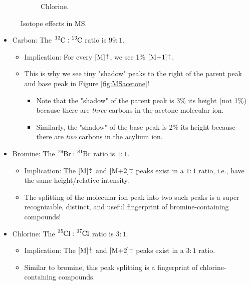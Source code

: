 \documentclass[../notes.tex]{subfiles}
\begin{document}
\begin{itemize}
\begin{figure}[H]
\begin{subfigure}[b]{0.17\linewidth}
            \caption{Chlorine.}
            \label{fig:isotopeEffectsMSc}
        \end{subfigure}
        \caption{Isotope effects in MS.}
        \label{fig:isotopeEffectsMS}
    \end{figure}
    \begin{itemize}
        \item Carbon: The $\ce{{}^12C}:\ce{{}^13C}$ ratio is $99:1$.
        \begin{itemize}
            \item Implication: For every $\cnc{M}\rc$, we see 1\% $\cnc{M$+1$}\rc$.
            \item This is why we see tiny "shadow" peaks to the right of the parent peak and base peak in Figure \ref{fig:MSacetone}!
            \begin{itemize}
                \item Note that the "shadow" of the parent peak is 3\% its height (not 1\%) because there are \emph{three} carbons in the acetone molecular ion.
                \item Similarly, the "shadow" of the base peak is 2\% its height because there are \emph{two} carbons in the acylium ion.
            \end{itemize}
        \end{itemize}
        \item Bromine: The $\ce{{}^79Br}:\ce{{}^81Br}$ ratio is $1:1$.
        \begin{itemize}
            \item Implication: The $\cnc{M}\rc$ and $\cnc{M$+2$}\rc$ peaks exist in a $1:1$ ratio, i.e., have the same height/relative intensity.
            \item The splitting of the molecular ion peak into two such peaks is a super recognizable, distinct, and useful fingerprint of bromine-containing compounds!
        \end{itemize}
        \item Chlorine: The $\ce{{}^35Cl}:\ce{{}^37Cl}$ ratio is $3:1$.
        \begin{itemize}
            \item Implication: The $\cnc{M}\rc$ and $\cnc{M$+2$}\rc$ peaks exist in a $3:1$ ratio.
            \item Similar to bromine, this peak splitting is a fingerprint of chlorine-containing compounds.
        \end{itemize}

\end{itemize}
\end{itemize}
\end{document}
